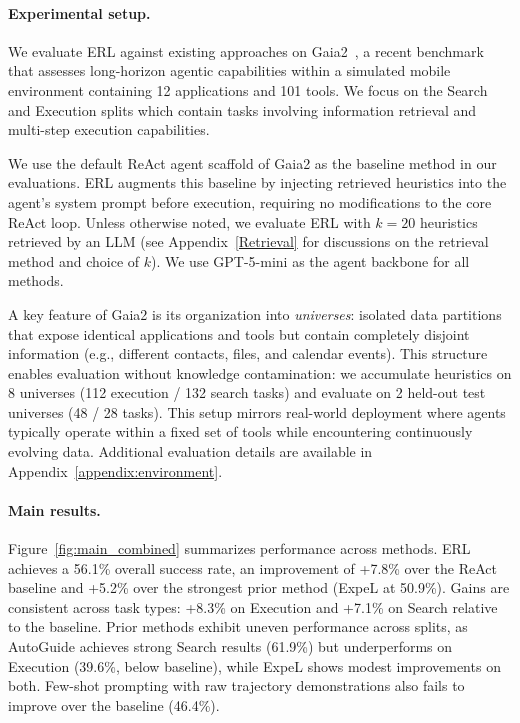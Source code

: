 \documentclass{article}
\begin{document}
\paragraph{Experimental setup.} We evaluate ERL against existing approaches on Gaia2~\citep{froger2025arescalingagentenvironments}, a recent benchmark that assesses long-horizon agentic capabilities within a simulated mobile environment containing 12 applications and 101 tools. We focus on the Search and Execution splits which contain tasks involving information retrieval and multi-step execution capabilities.

We use the default ReAct agent scaffold of Gaia2 as the baseline method in our evaluations. ERL augments this baseline by injecting retrieved heuristics into the agent's system prompt before execution, requiring no modifications to the core ReAct loop. Unless otherwise noted, we evaluate ERL with $k=20$ heuristics retrieved by an LLM (see Appendix~\ref{Retrieval} for discussions on the retrieval method and choice of $k$). We use GPT-5-mini as the agent backbone for all methods.

A key feature of Gaia2 is its organization into \textit{universes}: isolated data partitions that expose identical applications and tools but contain completely disjoint information (e.g., different contacts, files, and calendar events). This structure enables evaluation without knowledge contamination: we accumulate heuristics on 8 universes (112 execution / 132 search tasks) and evaluate on 2 held-out test universes (48 / 28 tasks). This setup mirrors real-world deployment where agents typically operate within a fixed set of tools while encountering continuously evolving data. Additional evaluation details are available in Appendix~\ref{appendix:environment}.

\paragraph{Main results.} Figure~\ref{fig:main_combined} summarizes performance across methods. ERL achieves a 56.1\% overall success rate, an improvement of +7.8\% over the ReAct baseline and +5.2\% over the strongest prior method (ExpeL at 50.9\%). Gains are consistent across task types: +8.3\% on Execution and +7.1\% on Search relative to the baseline. Prior methods exhibit uneven performance across splits, as AutoGuide achieves strong Search results (61.9\%) but underperforms on Execution (39.6\%, below baseline), while ExpeL shows modest improvements on both. Few-shot prompting with raw trajectory demonstrations also fails to improve over the baseline (46.4\%).
\end{document}
